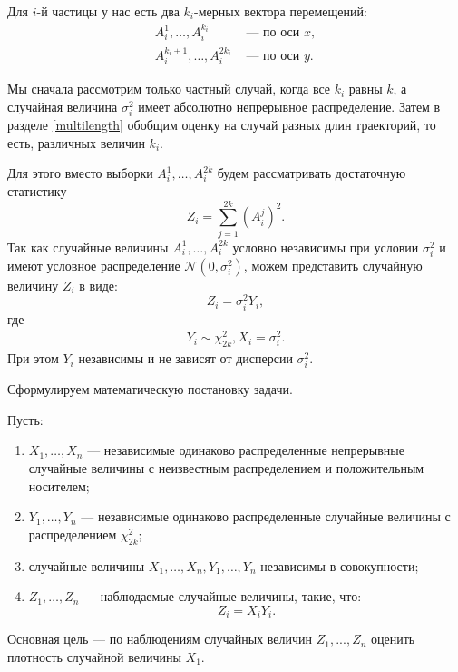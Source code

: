 \documentclass[../paper.tex]{subfiles}
\begin{document}
Для $i$-й частицы у нас есть два $k_i$-мерных вектора перемещений: 
\begin{align*}
	A_i^1, \dots, A_i^{k_i} &\text{ --- по оси } x, \\
	A_i^{k_i+1}, \dots, A_i^{2k_i} &\text{ --- по оси } y
.\end{align*}

Мы сначала рассмотрим только частный случай,
когда все $k_i$ равны $k$, а случайная величина $\sigma_i^2$ имеет абсолютно непрерывное распределение.
Затем в разделе \ref{multilength} обобщим оценку на случай разных длин траекторий, то есть, различных величин $k_i$.

Для этого вместо выборки $A_i^1, \dots, A_i^{2k}$ будем рассматривать
достаточную статистику 
\[
	Z_i = \sum\limits_{j=1}^{2k} \left(A_i^j\right)^2
.\]
Так как случайные величины $A_i^1, \dots, A_i^{2k}$ условно независимы при условии $\sigma_i^2$ и имеют условное
распределение $\mathcal{N}\left(0, \sigma_i^2\right)$, можем представить случайную величину $Z_i$ в виде:
\[
Z_i = \sigma_i^2 Y_i,
\]
где 
\begin{align*}
	Y_i \sim \chi^2_{2k},
	X_i = \sigma_i^2
.\end{align*}
При этом $Y_i$ независимы и не зависят от дисперсии $\sigma_i^2$.

Сформулируем математическую постановку задачи.

\begin{Probl}
	Пусть:
	\begin{enumerate}
		\item $X_1, \dots, X_n$ --- независимые одинаково распределенные непрерывные случайные величины
			с неизвестным распределением и положительным носителем; 
		\item $Y_1, \dots, Y_n$ --- независимые одинаково распределенные случайные величины с распределением $\chi^2_{2k}$;
		\item случайные величины $X_1, \dots, X_n, Y_1, \dots, Y_n$ независимы в совокупности;
		\item $Z_1, \dots, Z_n$ --- наблюдаемые случайные величины, такие, что:
			\[
				Z_i = X_i Y_i
			.\]
	\end{enumerate}
	Основная цель --- по наблюдениям случайных величин $Z_1, ..., Z_n$ оценить плотность случайной величины $X_1$.
\end{Probl}
\end{document}
